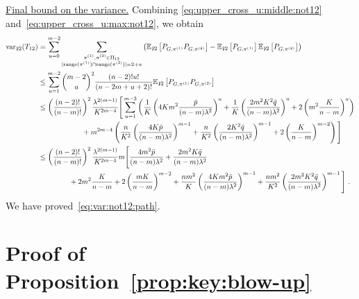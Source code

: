 \documentclass[final]{colt2026}
\newcommand{\1}{\mathbf{1}}
\newcommand{\bbE}{\mathbb{E}}
\newcommand{\pa}[1]{\left(#1\right)}
\newcommand{\cro}[1]{\left[#1\right]}
\begin{document}
\noindent\underline{Final bound on the variance.}
Combining \eqref{eq:upper_cross_u:middle:not12} and~\eqref{eq:upper_cross_u:max:not12},  we obtain 
\begin{align*}
\text{var}_{\not 12}(T_{12}) &= \sum_{u=0}^{m-2} \sum_{\substack{\pi^{(1)},\pi^{(2)}\in \Pi_{12}\\ |\text{range}(\pi^{(1)})\cap \text{range}(\pi^{(2)})|=2+u}}
\pa{\bbE_{\not 12}\cro{P_{G,\pi^{(1)}}P_{G,\pi^{(2)}}}-\bbE_{\not 12}\cro{P_{G,\pi^{(1)}}}\bbE_{\not 12}\cro{P_{G,\pi^{(2)}}}}\\
&\leq \sum_{u=1}^{m-2}  \binom{m-2}{u}^{2} {(n-2)!u!\over (n-2m+u+2)!}\bbE_{\not 12}\cro{P_{G,\pi^{(1)}}P_{G,\pi^{(2)}}} \\ 
&\leq \left(\frac{(n-2)!}{(n-m)!}\right)^2  \frac{\lambda^{2(m-1)}}{K^{2m-4}}\Bigg[\sum_{u=1}^{m-3} \left(\frac{1}{K} \left(4Km^2\frac{\bar p}{ (n-m) \lambda^2}\right)^{u}+  \frac{1}{K}\left(\frac{2m^2K^2\bar{q}}{(n-m) \lambda^2} \right)^{u} + 2\left(m^2\frac{K}{n-m}\right)^u \right)   
\\ & \quad \quad\quad \quad \quad \quad + m^{2m-4}\left( \frac{n}{K^2} \left(\frac{4K\bar p}{(n-m)\lambda^2}\right)^{m-1}+ \frac{n}{K^2}\left(\frac{2K^2\bar{q}}{(n-m)\lambda^2} \right)^{m-1} + 2\left(\frac{K}{n-m}\right)^{m-2}\right)\Bigg]\\
&\leq \left(\frac{(n-2)!}{(n-m)!}\right)^2 \frac{\lambda^{2(m-1)}}{K^{2m-4}}m \Bigg[\frac{4m^2 \bar p}{ (n-m) \lambda^2}+  \frac{2m^2K\bar{q}}{(n-m) \lambda^2}\\ 
&\hspace{1.5cm}+ 2m^2\frac{K}{n-m}+ 2\left(\frac{mK}{n-m}\right)^{m-2}+  \frac{nm^2}{K} \left(\frac{4Km^2\bar p}{(n-m)\lambda^2}\right)^{m-1}  + \frac{n m^2}{K^2}\left(\frac{2m^2K^2\bar{q}}{(n-m)\lambda^2} \right)^{m-1}
\Bigg] \ . 
\end{align*}
We  have proved~\eqref{eq:var:not12:path}.





\section{Proof of Proposition~\ref{prop:key:blow-up}}\label{sec:key:blow-up}
\end{document}
